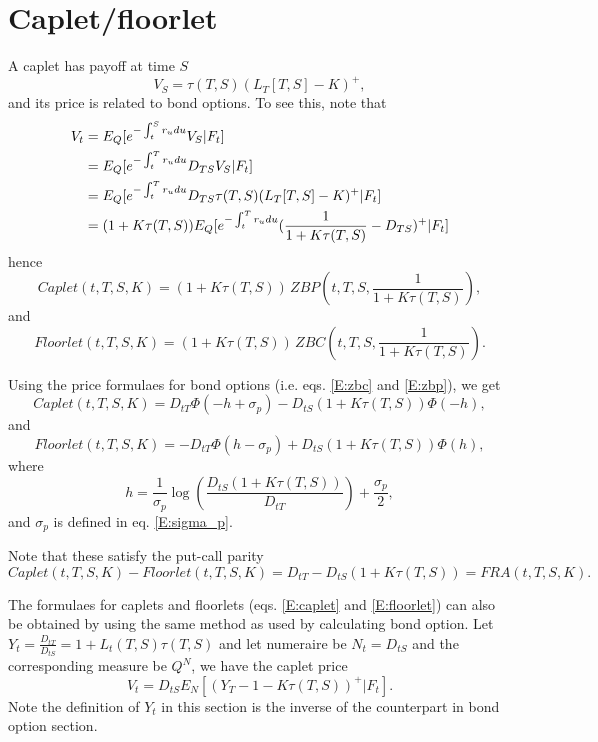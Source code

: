 \section{Caplet/floorlet}
A caplet has payoff at time $S$
\[
  V_S = \tau(T,S) (L_T[T,S]-K)^+,
\]
and its price is related to bond options. To see this, note that
\begin{align*}
  V_t &= E_Q[e^{-\int_t^S r_u du} V_S | F_t]  \notag \\
      &= E_Q[e^{-\int_t^T r_u du} D_{TS} V_S | F_t]  \notag \\
      &= E_Q[e^{-\int_t^T r_u du} D_{TS} \tau(T,S) (L_T[T,S]-K)^+ | F_t]  
         \notag \\
      &= (1+K\tau(T,S)) 
         E_Q[e^{-\int_t^T r_u du} (\frac{1}{1+K\tau(T,S)}-D_{TS})^+ | F_t]  
         \notag \\
\end{align*}
hence
\[
  Caplet(t,T,S,K) = (1+K\tau(T,S))\, ZBP(t,T,S,\frac{1}{1+K\tau(T,S)}),
\]
and
\[
  Floorlet(t,T,S,K) = (1+K\tau(T,S))\, ZBC(t,T,S,\frac{1}{1+K\tau(T,S)}).
\]

Using the price formulaes for bond options (i.e. eqs. \ref{E:zbc} and
\ref{E:zbp}), we get 
\begin{equation} \label{E:caplet}
  Caplet(t,T,S,K) = D_{tT}\Phi(-h+\sigma_p) - D_{tS}(1+K\tau(T,S)) \Phi(-h),
\end{equation}
and
\begin{equation} \label{E:floorlet}
  Floorlet(t,T,S,K) = -D_{tT}\Phi(h-\sigma_p) + D_{tS}(1+K\tau(T,S)) \Phi(h),
\end{equation}
where 
\[
  h = \frac{1}{\sigma_p} \log\left( \frac{D_{tS}(1+K\tau(T,S))}{D_{tT}} \right)
        + \frac{\sigma_p}{2},
\]
and $\sigma_p$ is defined in eq. \ref{E:sigma_p}.

Note that these satisfy the put-call parity
\[
  Caplet(t,T,S,K)-Floorlet(t,T,S,K) = D_{tT}-D_{tS}(1+K\tau(T,S)) 
    = FRA(t,T,S,K).
\]

The formulaes for caplets and floorlets (eqs. \ref{E:caplet} and
\ref{E:floorlet}) can also be obtained by using the same method as used by
calculating bond option. Let $Y_t=\frac{D_{tT}}{D_{tS}}=1+L_t(T,S)\tau(T,S)$ 
and let numeraire be $N_t=D_{tS}$ and the corresponding measure be $Q^N$,
we have the caplet price 
\[
  V_t = D_{tS} E_N[(Y_T-1-K\tau(T,S))^+|F_t].
\]
Note the definition of $Y_t$ in this section is the inverse of the counterpart
in bond option section.

